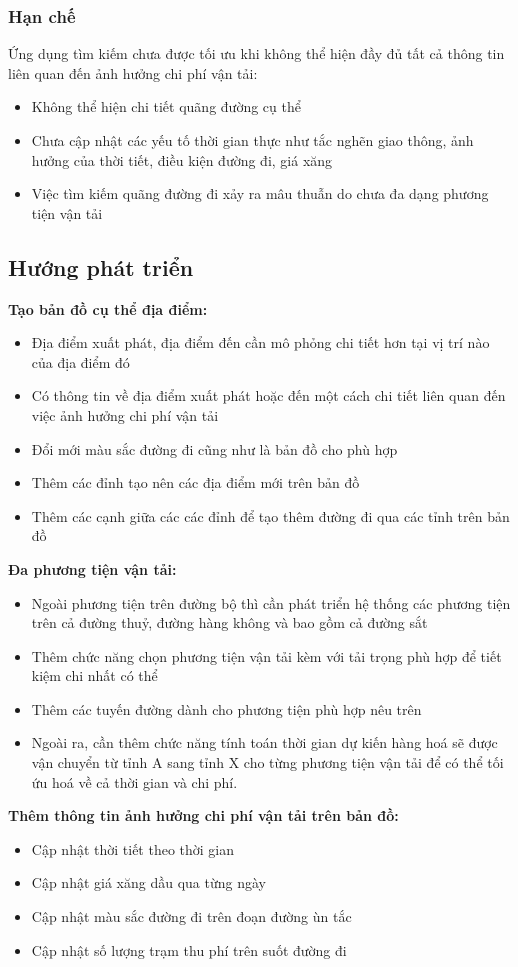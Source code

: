 \documentclass[a4paper]{article}
\begin{document}
\subsubsection{Hạn chế}
Ứng dụng tìm kiếm chưa được tối ưu khi không thể hiện đầy đủ tất cả thông tin liên quan đến ảnh hưởng chi phí vận tải:
\begin{itemize}
\item Không thể hiện chi tiết quãng đường cụ thể
\item Chưa cập nhật các yếu tố thời gian thực như tắc nghẽn giao thông,  ảnh hưởng của thời tiết, điều kiện đường đi, giá xăng
\item Việc tìm kiếm quãng đường đi xảy ra mâu thuẫn do chưa đa dạng phương tiện vận tải
\end{itemize}
\subsection{Hướng phát triển}
\textbf{Tạo bản đồ cụ thể địa điểm:}
\begin{itemize}
\item Địa điểm xuất phát, địa điểm đến cần mô phỏng chi tiết hơn tại vị trí nào của địa điểm đó
\item Có thông tin về địa điểm xuất phát hoặc đến một cách chi tiết liên quan đến việc ảnh hưởng chi phí vận tải 
\item Đổi mới màu sắc đường đi cũng như là bản đồ cho phù hợp 
\item Thêm các đỉnh tạo nên các địa điểm mới trên bản đồ
\item Thêm các cạnh giữa các các đỉnh để tạo thêm đường đi qua các tỉnh trên bản đồ
\end{itemize}
\textbf{Đa phương tiện vận tải:}
\begin{itemize}
\item Ngoài phương tiện trên đường bộ thì cần phát triển hệ thống các phương tiện trên cả đường thuỷ, đường hàng không và bao gồm cả đường sắt  
\item Thêm chức năng chọn phương tiện vận tải kèm với tải trọng phù hợp để tiết kiệm chi nhất có thể
\item Thêm các tuyến đường dành cho phương tiện phù hợp nêu trên
\item Ngoài ra, cần thêm chức năng tính toán thời gian dự kiến hàng hoá sẽ được vận chuyển từ tỉnh A sang tỉnh X cho từng phương tiện vận tải để có thể tối ứu hoá về cả thời gian và chi phí. 
\end{itemize}
\textbf{Thêm thông tin ảnh hưởng chi phí vận tải trên bản đồ:}
\begin{itemize}
\item Cập nhật thời tiết theo thời gian
\item Cập nhật giá xăng dầu qua từng ngày
\item Cập nhật màu sắc đường đi trên đoạn đường ùn tắc
\item Cập nhật số lượng trạm thu phí trên suốt đường đi
\end{itemize}
\end{document}
